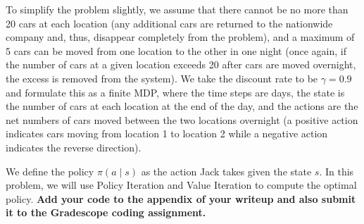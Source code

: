\documentclass{article}
\begin{document}
To simplify the problem slightly, we assume that there cannot be no more than 20 cars at each location (any additional cars are returned to the nationwide company and, thus, disappear completely from the problem), and a maximum of 5 cars can be moved from one location to the other in one night (once again, if the number of cars at a given location exceeds 20 after cars are moved overnight, the excess is removed from the system). We take the discount rate to be $\gamma = 0.9$ and formulate this as a finite MDP, where the time steps are days, the state is the number of cars at each location at the end of the day, and the actions are the net numbers of cars moved between the two locations overnight (a positive action indicates cars moving from location 1 to location 2 while a negative action indicates the reverse direction). 

We define the policy $\pi(a \mid s)$ as the action Jack takes given the state $s$. In this problem, we will use Policy Iteration and Value Iteration to compute the optimal policy.
\textbf{Add your code to the appendix of your writeup and also submit it to the Gradescope coding assignment.}
\end{document}
